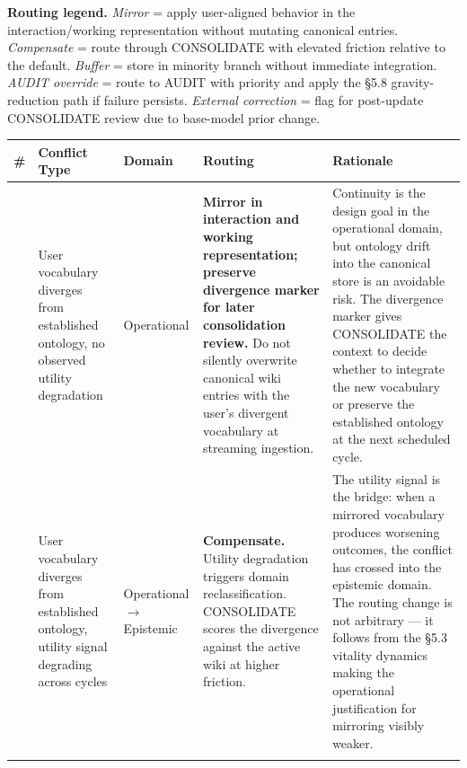 \documentclass[
  11pt,
]{article}
\begin{document}
\textbf{Routing legend.} \emph{Mirror} = apply user-aligned behavior in
the interaction/working representation without mutating canonical
entries. \emph{Compensate} = route through CONSOLIDATE with elevated
friction relative to the default. \emph{Buffer} = store in minority
branch without immediate integration. \emph{AUDIT override} = route to
AUDIT with priority and apply the §5.8 gravity-reduction path if failure
persists. \emph{External correction} = flag for post-update CONSOLIDATE
review due to base-model prior change.

\begingroup\small
\setlength{\tabcolsep}{4pt}
\renewcommand{\arraystretch}{1.15}
\begin{longtable}{@{}>{\raggedright\arraybackslash}p{0.35cm}>{\raggedright\arraybackslash}p{2.8cm}>{\raggedright\arraybackslash}p{1.7cm}>{\raggedright\arraybackslash}p{4.8cm}>{\raggedright\arraybackslash}p{5.6cm}@{}}
\toprule
\textbf{\#} & \textbf{Conflict Type} & \textbf{Domain} & \textbf{Routing} & \textbf{Rationale} \\
\midrule
\endhead
1 & User vocabulary diverges from established ontology, no observed utility degradation & Operational & \textbf{Mirror in interaction and working representation; preserve divergence marker for later consolidation review.} Do not silently overwrite canonical wiki entries with the user's divergent vocabulary at streaming ingestion. & Continuity is the design goal in the operational domain, but ontology drift into the canonical store is an avoidable risk. The divergence marker gives CONSOLIDATE the context to decide whether to integrate the new vocabulary or preserve the established ontology at the next scheduled cycle. \\
\addlinespace
2 & User vocabulary diverges from established ontology, utility signal degrading across cycles & Operational $\rightarrow$ Epistemic & \textbf{Compensate.} Utility degradation triggers domain reclassification. CONSOLIDATE scores the divergence against the active wiki at higher friction. & The utility signal is the bridge: when a mirrored vocabulary produces worsening outcomes, the conflict has crossed into the epistemic domain. The routing change is not arbitrary --- it follows from the \S5.3 vitality dynamics making the operational justification for mirroring visibly weaker. \\
\addlinespace

\end{longtable}
\end{document}
